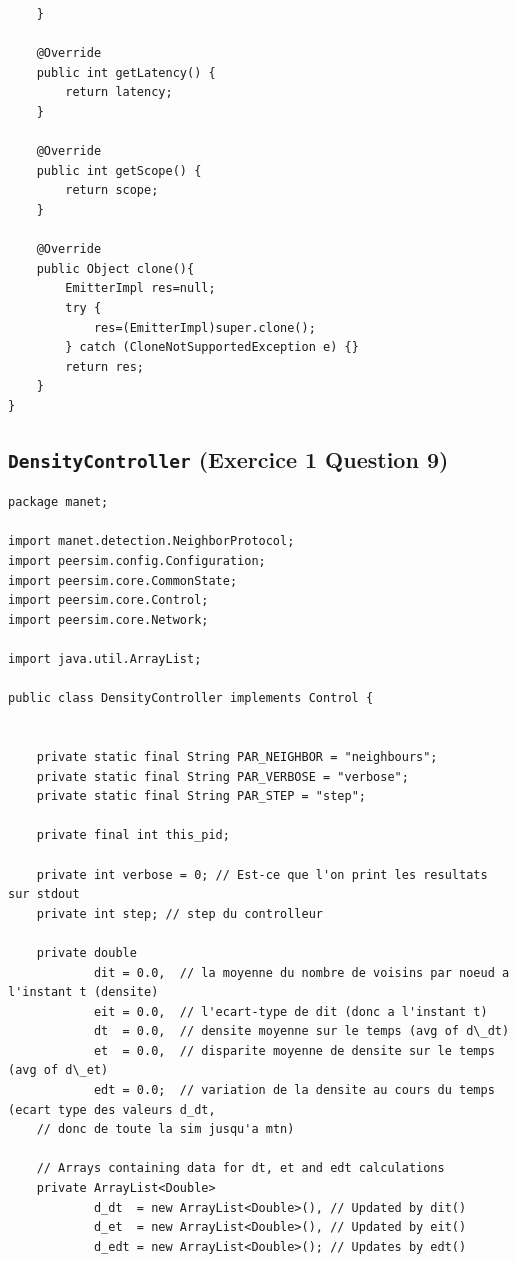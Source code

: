 \documentclass[a4paper]{article}
\begin{document}
\begin{appendix}
\begin{lstlisting}
    }

    @Override
    public int getLatency() {
        return latency;
    }

    @Override
    public int getScope() {
        return scope;
    }

    @Override
    public Object clone(){
        EmitterImpl res=null;
        try {
            res=(EmitterImpl)super.clone();
        } catch (CloneNotSupportedException e) {}
        return res;
    }
}

\end{lstlisting}


\subsection{\texttt{DensityController} (Exercice 1 Question 9)}

\begin{lstlisting}
package manet;

import manet.detection.NeighborProtocol;
import peersim.config.Configuration;
import peersim.core.CommonState;
import peersim.core.Control;
import peersim.core.Network;

import java.util.ArrayList;

public class DensityController implements Control {


    private static final String PAR_NEIGHBOR = "neighbours";
    private static final String PAR_VERBOSE = "verbose";
    private static final String PAR_STEP = "step";

    private final int this_pid;

    private int verbose = 0; // Est-ce que l'on print les resultats sur stdout
    private int step; // step du controlleur

    private double
            dit = 0.0,  // la moyenne du nombre de voisins par noeud a l'instant t (densite)
            eit = 0.0,  // l'ecart-type de dit (donc a l'instant t)
            dt  = 0.0,  // densite moyenne sur le temps (avg of d\_dt)
            et  = 0.0,  // disparite moyenne de densite sur le temps (avg of d\_et)
            edt = 0.0;  // variation de la densite au cours du temps (ecart type des valeurs d_dt,
    // donc de toute la sim jusqu'a mtn)

    // Arrays containing data for dt, et and edt calculations
    private ArrayList<Double>
            d_dt  = new ArrayList<Double>(), // Updated by dit()
            d_et  = new ArrayList<Double>(), // Updated by eit()
            d_edt = new ArrayList<Double>(); // Updates by edt()


\end{lstlisting}
\end{appendix}
\end{document}
